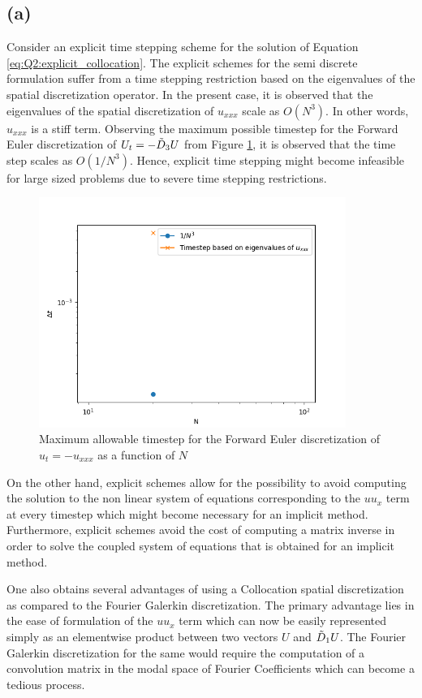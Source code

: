 \documentclass[12pt]{article}
\begin{document}
\subsection{(a)}
Consider an explicit time stepping scheme for the solution of Equation \ref{eq:Q2:explicit_collocation}. The explicit schemes for the semi discrete formulation suffer from a time stepping restriction based on the eigenvalues of the spatial discretization operator. In the present case, it is observed that the eigenvalues of the spatial discretization of $u_{xxx}$ scale as $O(N^3)$. In other words, $u_{xxx}$ is a stiff term. Observing the maximum possible timestep for the Forward Euler discretization of $U_t = -\Tilde{D}_3 U$ from Figure \ref{fig:uxxxtime}, it is observed that the time step scales as $O(1/N^3)$. Hence, explicit time stepping might become infeasible for large sized problems due to severe time stepping restrictions.
\begin{figure}
    \centering
    \includegraphics[width=10cm]{Q2Timestep_uxxx.png}
    \caption{Maximum allowable timestep for the Forward Euler discretization of $u_t = -u_{xxx}$ as a function of $N$}
    \label{fig:uxxxtime}
\end{figure}
On the other hand, explicit schemes allow for the possibility to avoid computing the solution to the non linear system of equations corresponding to the $uu_x$ term at every timestep which might become necessary for an implicit method. Furthermore, explicit schemes avoid the cost of computing a matrix inverse in order to solve the coupled system of equations that is obtained for an implicit method.

One also obtains several advantages of using a Collocation spatial discretization as compared to the Fourier Galerkin discretization. The primary advantage lies in the ease of formulation of the $uu_x$ term which can now be easily represented simply as an elementwise product between two vectors $U$ and $\Tilde{D}_1U$. The Fourier Galerkin discretization for the same would require the computation of a convolution matrix in the modal space of Fourier Coefficients which can become a tedious process.
\end{document}
